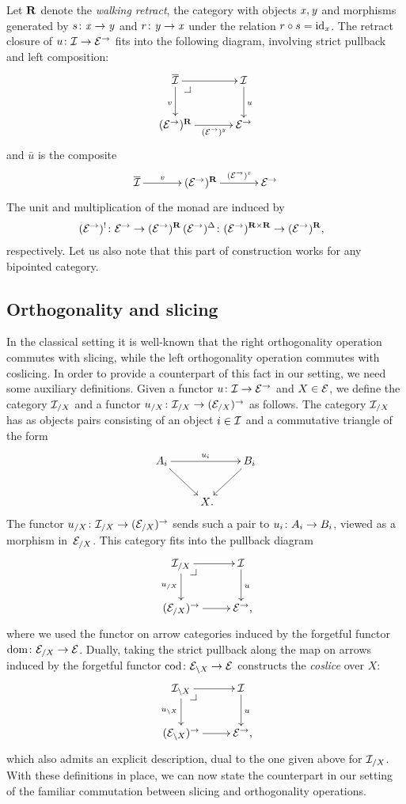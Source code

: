 \documentclass[reqno,10pt,a4paper,oneside,draft]{amsart}
\begin{document}
\begin{remark}
Let $\ret$ denote the \emph{walking retract}, \ie the category with objects $\retA, \retB$ and morphisms generated by $s \co \retA \to \retB$ and $r \co \retB \to \retA$ under the relation $r \cc s = \id_{\retA}$.
The retract closure of $u \co \cal{I} \to \catE^\to$ fits into the following diagram, involving strict pullback and left composition:
\[
\xymatrix@C+1em{
  \overline{\cal{I}}
  \ar[r]
  \ar[d]_v
  \pullback{dr}
&
  \cal{I}
  \ar[d]^{u}
\\
  (\catE^\to)^{\ret}
  \ar[r]_-{(\catE^\to)^{\retB}}
&
  \catE^\to
}
\]
and $\bar{u}$ is the composite
\[
\xymatrix@C+1em{
  \overline{\cal{I}} \ar[r]^-v &  (\cal{E}^\to)^\ret \ar[r]^-{(\cal{E}^\to)^\retA} & \cal{E}^\to }
\]
The unit and multiplication of the monad are induced by
\begin{align*}
(\catE^\to)^{\canonical} \co \catE^\to \to (\catE^\to)^{\ret} \, &
(\catE^\to)^{\Delta} \co (\catE^\to)^{\ret \times \ret} \to (\catE^\to)^{\ret} \rlap{,}
\end{align*}
respectively.
Let us also note that this part of construction works for any bipointed category.
\end{remark}

\subsection*{Orthogonality and slicing}
In the classical setting it is well-known that the right orthogonality operation commutes with slicing, while the left orthogonality operation commutes with coslicing.
In order to provide a counterpart of this fact in our setting, we need some auxiliary definitions.
Given a functor $u \co \cal{I} \to \catE^\to$ and $X \in \catE$, we define the category $\cal{I}_{/X}$ and a functor $u_{/X} \co
\cal{I}_{/X} \to (\cal{E}_{/X})^\to$ as follows.
The category $\cal{I}_{/X}$ has as objects pairs consisting of an object $i \in \cal{I}$ and a commutative triangle of the form
\[
\xymatrix{
  A_i \ar[dr] \ar[rr]^{u_i} & & B_i \ar[dl] \\
  & X \rlap{.}
}
\]
The functor $u_{/X} \co \cal{I}_{/X} \to (\cal{E}_{/X})^\to$ sends such a pair to $u_i \co A_i \to B_i$, viewed as a morphism in~$\cal{E}_{/X}$.
This category fits into the pullback diagram
\[
\xymatrix{
  \cal{I}_{/X}
  \ar[r]
  \ar[d]_{u_{/X}}
  \pullback{dr}
&
  \cal{I}
  \ar[d]^{u}
\\
  (\catE_{/X})^\to
  \ar[r]
&
  \catE^\to \rlap{,}
}
\]
where we used the functor on arrow categories induced by the forgetful functor $\operatorname{dom} \co \catE_{/X} \to \catE$.
Dually, taking the strict pullback along the map on arrows induced by the forgetful functor $\operatorname{cod} \co \cal{E}_{\backslash X} \to \catE$ constructs the \emph{coslice} over $X$:
\[
\xymatrix{
 \cal{I}_{\backslash X}
  \ar[r]
  \ar[d]_{u_{\backslash X}}
  \pullback{dr}
&
  \cal{I}
  \ar[d]^{u}
\\
  (\catE_{\backslash X})^\to
  \ar[r]
&
  \catE^\to \rlap{,}
}
\]
which also admits an explicit description, dual to the one given above for $\cal{I}_{/X}$.
With these definitions in place, we can now state the counterpart in our setting of the familiar commutation between slicing and orthogonality operations.
\end{document}
